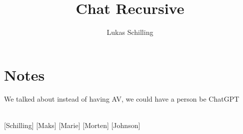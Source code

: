 \documentclass{article}
\title{Chat Recursive}
\author{Lukas Schilling}
\begin{document}
                
\maketitle
\section*{Notes}                %
We talked about instead of having AV, we could have a person be ChatGPT
\\\\
\begin{roles}
[Schilling]
[Maks]
[Marie]
[Morten]
[Johnson]
\end{roles}
\begin{props}
\end{props}
\end{document}
